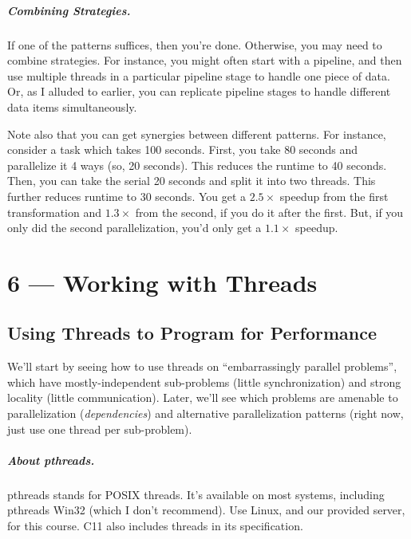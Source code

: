 \documentclass[a4paper]{report}
\newcommand{\CPP}{C\nolinebreak\hspace{-.05em}\raisebox{.4ex}{\tiny\bf +}\nolinebreak\hspace{-.10em}\raisebox{.4ex}{\tiny\bf +}}
\def\CPP{{C\nolinebreak[4]\hspace{-.05em}\raisebox{.4ex}{\tiny\bf ++}}}
\begin{document}
\paragraph{Combining Strategies.} If one of the patterns suffices,
then you're done. Otherwise, you may need to combine strategies.
For instance, you might often start with a pipeline, and then 
use multiple threads in a particular pipeline stage to handle one
piece of data. Or, as I alluded to earlier, you can replicate
pipeline stages to handle different data items simultaneously.

Note also that you can get synergies between different patterns.
For instance, consider a task which takes 100 seconds. First, you
take 80 seconds and parallelize it 4 ways (so, 20 seconds). This
reduces the runtime to 40 seconds. Then, you can take the serial 
20 seconds and split it into two threads. This further reduces 
runtime to 30 seconds. You get a $2.5\times$ speedup from the
first transformation and $1.3\times$ from the second, if you do it
after the first. But, if you only did the second parallelization,
you'd only get a $1.1\times$ speedup.










\chapter*{6 --- Working with Threads}


\section*{Using Threads to Program for Performance}
We'll start by seeing how to use threads on ``embarrassingly parallel problems'', which have mostly-independent sub-problems (little synchronization) and strong locality (little communication). Later, we'll see which problems are amenable to parallelization (\emph{dependencies}) and alternative parallelization patterns (right now, just use one thread per sub-problem).

\paragraph{About pthreads.} pthreads stands for POSIX threads. It's available
on most systems, including pthreads Win32 (which I don't recommend).
Use Linux, and our provided server, for this course. \CPP 11 also includes threads
in its specification.
\end{document}
